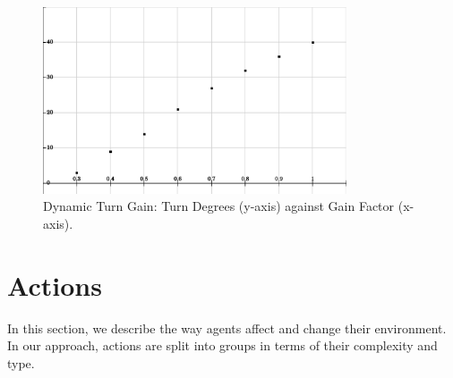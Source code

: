 \begin{figure}[t!]
\centering
  \includegraphics[width=0.8\textwidth]{Chapter3/figures/DynamicTurn.pdf}
  \caption{Dynamic Turn Gain: Turn Degrees (y-axis) against Gain Factor (x-axis).}
  \label{fig:Turn}
\end{figure}


\section{Actions}
In this section, we describe the way agents affect and change their environment. In our approach, actions are split into groups in terms of their complexity and type.

